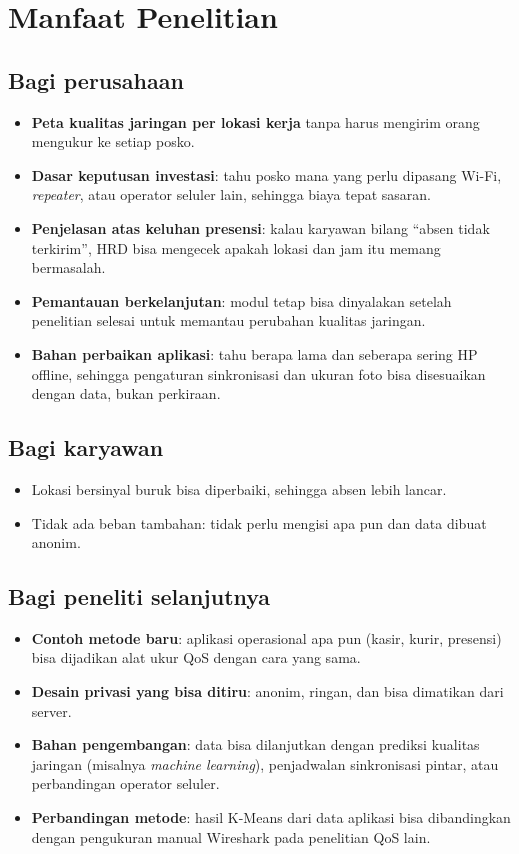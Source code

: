 \documentclass[11pt,a4paper]{article}
\begin{document}
\section{Manfaat Penelitian}
\subsection{Bagi perusahaan}
\begin{itemize}
\item \textbf{Peta kualitas jaringan per lokasi kerja} tanpa harus mengirim orang mengukur ke setiap posko.
\item \textbf{Dasar keputusan investasi}: tahu posko mana yang perlu dipasang Wi-Fi, \textit{repeater}, atau operator seluler lain, sehingga biaya tepat sasaran.
\item \textbf{Penjelasan atas keluhan presensi}: kalau karyawan bilang ``absen tidak terkirim'', HRD bisa mengecek apakah lokasi dan jam itu memang bermasalah.
\item \textbf{Pemantauan berkelanjutan}: modul tetap bisa dinyalakan setelah penelitian selesai untuk memantau perubahan kualitas jaringan.
\item \textbf{Bahan perbaikan aplikasi}: tahu berapa lama dan seberapa sering HP offline, sehingga pengaturan sinkronisasi dan ukuran foto bisa disesuaikan dengan data, bukan perkiraan.
\end{itemize}
\subsection{Bagi karyawan}
\begin{itemize}
\item Lokasi bersinyal buruk bisa diperbaiki, sehingga absen lebih lancar.
\item Tidak ada beban tambahan: tidak perlu mengisi apa pun dan data dibuat anonim.
\end{itemize}
\subsection{Bagi peneliti selanjutnya}
\begin{itemize}
\item \textbf{Contoh metode baru}: aplikasi operasional apa pun (kasir, kurir, presensi) bisa dijadikan alat ukur QoS dengan cara yang sama.
\item \textbf{Desain privasi yang bisa ditiru}: anonim, ringan, dan bisa dimatikan dari server.
\item \textbf{Bahan pengembangan}: data bisa dilanjutkan dengan prediksi kualitas jaringan (misalnya \textit{machine learning}), penjadwalan sinkronisasi pintar, atau perbandingan operator seluler.
\item \textbf{Perbandingan metode}: hasil K-Means dari data aplikasi bisa dibandingkan dengan pengukuran manual Wireshark pada penelitian QoS lain.
\end{itemize}
\end{document}
